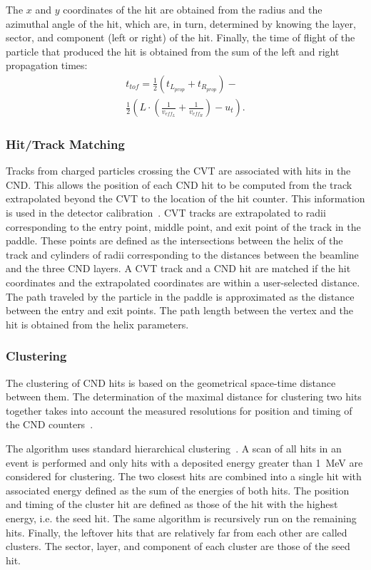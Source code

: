 The $x$ and $y$ coordinates of the hit are obtained from the radius and the azimuthal angle of the hit, which are,
in turn, determined by knowing the layer, sector, and component (left or right) of the hit. Finally, the time of flight
of the particle that produced the hit is obtained from the sum of the left and right propagation times:
\begin{multline}
  t_{tof} = \frac{1}{2} \left( t_{L_{prop}} + t_{R_{prop}} \right) - \\
  \frac{1}{2} \left( L \cdot \left( \frac{1}{v_{eff_L}} + \frac{1}{v_{eff_R}} \right)
  -u_t \right).
\end{multline}

\subsubsection{Hit/Track Matching}

Tracks from charged particles crossing the CVT are associated with hits in the CND. This allows the position of
each CND hit to be computed from the track extrapolated beyond the CVT to the location of the hit counter. This
information is used in the detector calibration~\cite{cnd-nim}. CVT tracks are extrapolated to radii corresponding
to the entry point, middle point, and exit point of the track in the paddle. These points are defined as the
intersections between the helix of the track and cylinders of radii corresponding to the distances between the
beamline and the three CND layers. A CVT track and a CND hit are matched if the hit coordinates and the
extrapolated coordinates are within a user-selected distance. The path traveled by the particle in the paddle is
approximated as the distance between the entry and exit points. The path length between the vertex and the hit is
obtained from the helix parameters.

\subsubsection{Clustering}

The clustering of CND hits is based on the geometrical space-time distance between them. The determination of
the maximal distance for clustering two hits together takes into account the measured resolutions for position and
timing of the CND counters~\cite{cnd-nim}.

The algorithm uses standard hierarchical clustering~\cite{Day1984}. A scan of all hits in an event is performed and
only hits with a deposited energy greater than 1~MeV are considered for clustering. The two closest hits are
combined into a single hit with associated energy defined as the sum of the energies of both hits. The position and
timing of the cluster hit are defined as those of the hit with the highest energy, i.e. the seed hit. The same algorithm
is recursively run on the remaining hits. Finally, the leftover hits that are relatively far from each other are called
clusters. The sector, layer, and component of each cluster are those of the seed hit.
